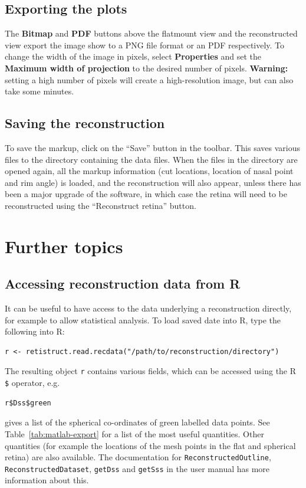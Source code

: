 \documentclass{book}
\begin{document}
\section{Exporting the plots}
\label{retistruct-user-guide:sec:exporting-plots}

The \textbf{Bitmap} and \textbf{PDF} buttons above the flatmount view
and the reconstructed view export the image show to a PNG file format
or an PDF respectively. To change the width of the image in pixels,
select \textbf{Properties} and set the
\textbf{Maximum width of projection} to the desired number of pixels.
\textbf{Warning:} setting a high number of pixels will create a
high-resolution image, but can also take some minutes.

\section{Saving the reconstruction}
\label{manual:sec:saving-reconstr}

To save the markup, click on the ``Save'' button in the toolbar. This
saves various files to the directory containing the data files. When
the files in the directory are opened again, all the markup
information (cut locations, location of nasal point and rim angle) is
loaded, and the reconstruction will also appear, unless there has been
a major upgrade of the software, in which case the retina will need to
be reconstructed using the ``Reconstruct retina'' button.

\chapter{Further topics}
\label{retistruct-user-guide:cha:advanced-topics}

\section{Accessing reconstruction data from R}
\label{retistruct-user-guide:sec:reading-date-into}

It can be useful to have access to the data underlying a
reconstruction directly, for example to allow statistical analysis.
To load saved date into R, type the following into R:
\begin{verbatim}
r <- retistruct.read.recdata("/path/to/reconstruction/directory")
\end{verbatim}
The resulting object \texttt{r} contains various fields, which can be
accessed using the R \texttt{\$} operator, e.g.
\begin{verbatim}
r$Dss$green
\end{verbatim}
gives a list of the spherical co-ordinates of green labelled
data points. See Table~\ref{tab:matlab-export} for a list of the most
useful quantities. Other quantities (for example the locations of the
mesh points in the flat and spherical retina) are also available. The
documentation for \texttt{ReconstructedOutline},
\texttt{ReconstructedDataset}, \texttt{getDss} and \texttt{getSss} in
the user manual has more information about this.
\end{document}
